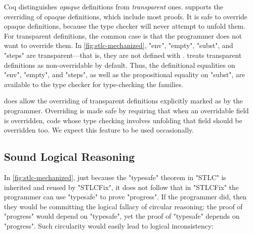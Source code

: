 Coq distinguishes \emph{opaque} definitions from \emph{transparent} ones.
\Lang supports the overriding of opaque definitions, which
include most proofs.
It is safe to override opaque definitions, because the type checker will
never attempt to unfold them.
For transparent definitions, the common case is that the programmer does
not want to override them.
In \cref{fig:stlc-mechanized}, "env", "empty", "subst", and "steps" are
transparent---that is, they are not defined with .
\Lang treats transparent definitions as non-overridable by default.
Thus, the definitional equalities on "env", "empty", and "steps",
as well as the propositional equality on "subst", are available to the
type checker for type-checking the families.

\Lang does allow the overriding of transparent definitions
explicitly marked as  by the programmer.
Overriding is made safe by requiring that when an overridable field is
overridden, code whose type checking involves unfolding that field
should be overridden too.
We expect this feature to be used occasionally.


\subsection{Sound Logical Reasoning}
\label{sec:sound}


In \cref{fig:stlc-mechanized}, just because the "typesafe" theorem in
"STLC" is inherited and reused by "STLCFix", it does not follow that
in "STLCFix" the programmer can use "typesafe" to prove "progress".
If the programmer did, then they would be committing the logical fallacy
of circular reasoning: the proof of "progress" would depend on "typesafe",
yet the proof of "typesafe" depends on "progress".
%
Such circularity would easily lead to logical inconsistency:

